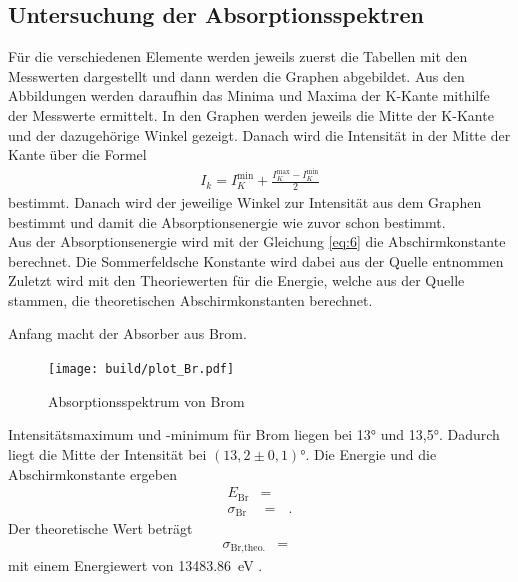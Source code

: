 \subsection{Untersuchung der Absorptionsspektren}

Für die verschiedenen Elemente werden jeweils zuerst die Tabellen
mit den Messwerten dargestellt und dann werden die Graphen
abgebildet.
Aus den Abbildungen werden daraufhin das Minima und Maxima der K-Kante 
mithilfe der Messwerte ermittelt.
In den Graphen werden jeweils die Mitte der K-Kante
und der dazugehörige Winkel gezeigt.
Danach wird die Intensität in der Mitte der Kante über die Formel \cite{V602}
\begin{align}
    I_k = I_K^{\text{min}}+\frac{I_K^{\text{max}}-I_K^{\text{min}}}{2} \label{eq:26}
\end{align}
bestimmt.
Danach wird der jeweilige Winkel zur Intensität aus dem Graphen bestimmt und damit
die Absorptionsenergie wie zuvor schon bestimmt. \\
Aus der Absorptionsenergie wird mit der Gleichung \eqref{eq:6} die Abschirmkonstante berechnet.
Die Sommerfeldsche Konstante wird dabei aus der Quelle \cite{ertel1935sommerfeldsche}
entnommen
Zuletzt wird mit den Theoriewerten für die Energie, welche aus der Quelle \cite{NIST}
stammen, die theoretischen Abschirmkonstanten berechnet.

\justifying Anfang macht der Absorber aus Brom.


\begin{figure}[H]
    \centering
    \texttt{[image: build/plot\_Br.pdf]}
    \caption{Absorptionsspektrum von Brom\cite{matplotlib}}
    \label{fig:4}
\end{figure}

\justifying Intensitätsmaximum und -minimum für Brom liegen bei 13° und 13,5°.
Dadurch liegt die Mitte der Intensität bei $(13,2\pm 0,1)°$.
Die Energie und die Abschirmkonstante ergeben
\begin{align}
    E_{\text{Br}}&= \text{ }  \label{eq:27} \\
    \sigma_{\text{Br}}&= \text{ }  \label{eq:28}.
\end{align}
Der theoretische Wert beträgt 
\begin{align}
    \sigma_{\text{Br,theo.}}&= \text{ }  \label{eq:29}
\end{align}
mit einem Energiewert von \SI{13483.86}{\electronvolt} \cite{NIST} .

